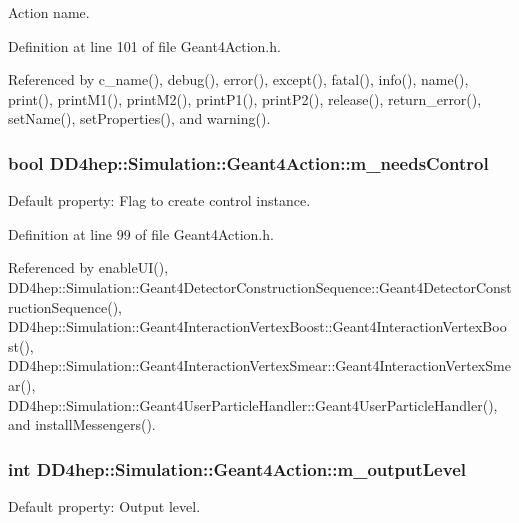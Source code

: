 Action name. 

Definition at line 101 of file Geant4Action.h.

Referenced by c\_\-name(), debug(), error(), except(), fatal(), info(), name(), print(), printM1(), printM2(), printP1(), printP2(), release(), return\_\-error(), setName(), setProperties(), and warning().\hypertarget{class_d_d4hep_1_1_simulation_1_1_geant4_action_a4d64f5159d58c4a43d74d0ddd0a695ba}{
\subsubsection[{m\_\-needsControl}]{\setlength{\rightskip}{0pt plus 5cm}bool {\bf DD4hep::Simulation::Geant4Action::m\_\-needsControl}}}
\label{class_d_d4hep_1_1_simulation_1_1_geant4_action_a4d64f5159d58c4a43d74d0ddd0a695ba}


Default property: Flag to create control instance. 

Definition at line 99 of file Geant4Action.h.

Referenced by enableUI(), DD4hep::Simulation::Geant4DetectorConstructionSequence::Geant4DetectorConstructionSequence(), DD4hep::Simulation::Geant4InteractionVertexBoost::Geant4InteractionVertexBoost(), DD4hep::Simulation::Geant4InteractionVertexSmear::Geant4InteractionVertexSmear(), DD4hep::Simulation::Geant4UserParticleHandler::Geant4UserParticleHandler(), and installMessengers().\hypertarget{class_d_d4hep_1_1_simulation_1_1_geant4_action_a6dc880b8e55e2dada947ad06d7678dd4}{
\subsubsection[{m\_\-outputLevel}]{\setlength{\rightskip}{0pt plus 5cm}int {\bf DD4hep::Simulation::Geant4Action::m\_\-outputLevel}}}
\label{class_d_d4hep_1_1_simulation_1_1_geant4_action_a6dc880b8e55e2dada947ad06d7678dd4}


Default property: Output level. 

